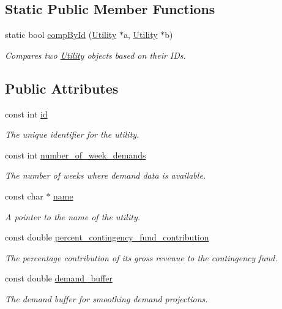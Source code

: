 \subsection*{Static Public Member Functions}
\begin{DoxyCompactItemize}
\item 
static bool \mbox{\hyperlink{classUtility_a360c97e7dd372f3ff57f94314743e53d}{comp\+By\+Id}} (\mbox{\hyperlink{classUtility}{Utility}} $\ast$a, \mbox{\hyperlink{classUtility}{Utility}} $\ast$b)
\begin{DoxyCompactList}\small\item\em Compares two \mbox{\hyperlink{classUtility}{Utility}} objects based on their I\+Ds. \end{DoxyCompactList}\end{DoxyCompactItemize}
\subsection*{Public Attributes}
\begin{DoxyCompactItemize}
\item 
const int \mbox{\hyperlink{classUtility_ad41c4ea5c911c5000452a3371cd65d5f}{id}}
\begin{DoxyCompactList}\small\item\em The unique identifier for the utility. \end{DoxyCompactList}\item 
const int \mbox{\hyperlink{classUtility_a0548db3746582251082aa430db49dad0}{number\+\_\+of\+\_\+week\+\_\+demands}}
\begin{DoxyCompactList}\small\item\em The number of weeks where demand data is available. \end{DoxyCompactList}\item 
const char $\ast$ \mbox{\hyperlink{classUtility_ad0ce5c179a7f5ceb46d4fcae08dbfb47}{name}}
\begin{DoxyCompactList}\small\item\em A pointer to the name of the utility. \end{DoxyCompactList}\item 
const double \mbox{\hyperlink{classUtility_a7b1a097ec188be8e7175d058b5e6596c}{percent\+\_\+contingency\+\_\+fund\+\_\+contribution}}
\begin{DoxyCompactList}\small\item\em The percentage contribution of its gross revenue to the contingency fund. \end{DoxyCompactList}\item 
const double \mbox{\hyperlink{classUtility_a4be9760339ec06e5c932890da8e566b3}{demand\+\_\+buffer}}
\begin{DoxyCompactList}\small\item\em The demand buffer for smoothing demand projections. \end{DoxyCompactList}\end{DoxyCompactItemize}


